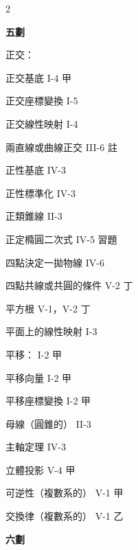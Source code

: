 \begin{multicols}{2}
\vspace{0.8em}
\begin{center}
\textbf{\large 五\quad 劃}
\end{center}

\noindent 正交：\par
\noindent\hspace*{1.5em} 正交基底 \hfill I-4 甲\par
\noindent\hspace*{1.5em} 正交座標變換 \hfill I-5\par
\noindent\hspace*{1.5em} 正交線性映射 \hfill I-4\par
\noindent 兩直線或曲線正交 \hfill III-6 註\par
\noindent 正性基底 \hfill IV-3\par
\noindent 正性標準化 \hfill IV-3\par
\noindent 正類錐線 \hfill II-3\par
\noindent 正定橢圓二次式 \hfill IV-5 習題\par
\noindent 四點決定一拋物線 \hfill IV-6\par
\noindent 四點共線或共圓的條件 \hfill V-2 丁\par
\noindent 平方根 \hfill V-1，V-2 丁\par
\noindent 平面上的線性映射 \hfill I-3\par
\noindent 平移： \hfill I-2 甲\par
\noindent\hspace*{1.5em} 平移向量 \hfill I-2 甲\par
\noindent\hspace*{1.5em} 平移座標變換 \hfill I-2 甲\par
\noindent 母線（圓錐的） \hfill II-3\par
\noindent 主軸定理 \hfill IV-3\par
\noindent 立體投影 \hfill V-4 甲\par
\noindent 可逆性（複數系的） \hfill V-1 甲\par
\noindent 交換律（複數系的） \hfill V-1 乙\par

\vspace{0.8em}
\begin{center}
\textbf{\large 六\quad 劃}
\end{center}


\end{multicols}
